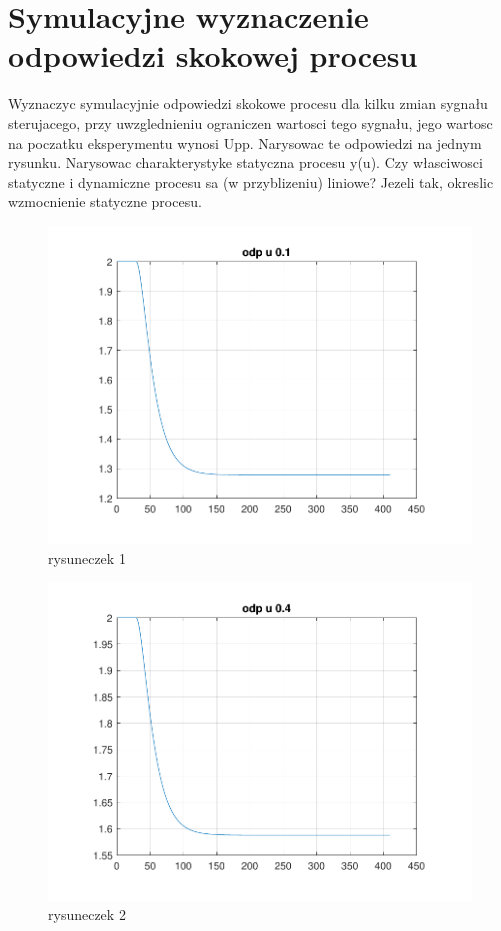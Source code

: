 \section{Symulacyjne wyznaczenie odpowiedzi skokowej procesu}
Wyznaczyc symulacyjnie odpowiedzi skokowe procesu dla kilku zmian sygnału sterujacego,
przy uwzglednieniu ograniczen wartosci tego sygnału, jego wartosc na poczatku
eksperymentu wynosi Upp. Narysowac te odpowiedzi na jednym rysunku. Narysowac
charakterystyke statyczna procesu y(u). Czy własciwosci statyczne i dynamiczne procesu
sa (w przyblizeniu) liniowe? Jezeli tak, okreslic wzmocnienie statyczne procesu.

\begin{figure}[H]
    \centering
    \includegraphics[scale=0.8]{../zad2/img/odp_u_0_1.pdf}
    \caption{rysuneczek 1}
\end{figure}
\begin{figure}[H]
    \centering
    \includegraphics[scale=0.8]{../zad2/img/odp_u_0_4.pdf}
    \caption{rysuneczek 2}
\end{figure}
